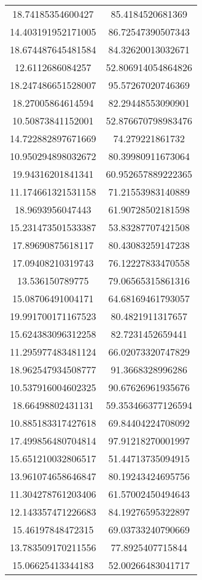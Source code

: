 \begin{table}
\begin{tabular}{cc}
18.74185354600427 & 85.4184520681369 \\
14.403191952171005 & 86.72547390507343 \\
18.674487645481584 & 84.32620013032671 \\
12.6112686084257 & 52.806914054864826 \\
18.247486651528007 & 95.57267020746369 \\
18.27005864614594 & 82.29448553090901 \\
10.50873841152001 & 52.876670798983476 \\
14.722882897671669 & 74.279221861732 \\
10.950294898032672 & 80.39980911673064 \\
19.94316201841341 & 60.952657889222365 \\
11.174661321531158 & 71.21553983140889 \\
18.9693956047443 & 61.90728502181598 \\
15.231473501533387 & 53.83287707421508 \\
17.89690875618117 & 80.43083259147238 \\
17.09408210319743 & 76.12227833470558 \\
13.536150789775 & 79.06565315861316 \\
15.08706491004171 & 64.68169461793057 \\
19.991700171167523 & 80.4821911317657 \\
15.624383096312258 & 82.7231452659441 \\
11.295977483481124 & 66.02073320747829 \\
18.962547934508777 & 91.3668328996286 \\
10.537916004602325 & 90.67626961935676 \\
18.66498802431131 & 59.353466377126594 \\
10.885183317427618 & 69.84404224708092 \\
17.499856480704814 & 97.91218270001997 \\
15.651210032806517 & 51.44713735094915 \\
13.961074658646847 & 80.19243424695756 \\
11.304278761203406 & 61.57002450494643 \\
12.143357471226683 & 84.19276595322897 \\
15.46197848472315 & 69.03733240790669 \\
13.783509170211556 & 77.8925407715844 \\
15.06625413344183 & 52.00266483041717 \\

\end{tabular}
\end{table}
